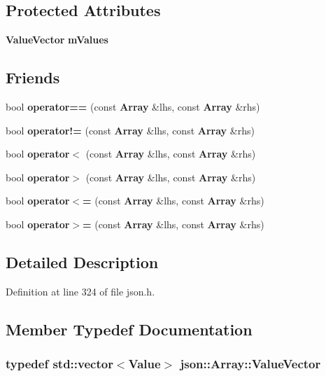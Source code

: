 \subsection*{Protected Attributes}
\begin{DoxyCompactItemize}
\item 
{\bf Value\+Vector} {\bf m\+Values}
\end{DoxyCompactItemize}
\subsection*{Friends}
\begin{DoxyCompactItemize}
\item 
bool {\bf operator==} (const {\bf Array} \&lhs, const {\bf Array} \&rhs)
\item 
bool {\bf operator!=} (const {\bf Array} \&lhs, const {\bf Array} \&rhs)
\item 
bool {\bf operator$<$} (const {\bf Array} \&lhs, const {\bf Array} \&rhs)
\item 
bool {\bf operator$>$} (const {\bf Array} \&lhs, const {\bf Array} \&rhs)
\item 
bool {\bf operator$<$=} (const {\bf Array} \&lhs, const {\bf Array} \&rhs)
\item 
bool {\bf operator$>$=} (const {\bf Array} \&lhs, const {\bf Array} \&rhs)
\end{DoxyCompactItemize}


\subsection{Detailed Description}


Definition at line 324 of file json.\+h.



\subsection{Member Typedef Documentation}
\subsubsection[{Value\+Vector}]{\setlength{\rightskip}{0pt plus 5cm}typedef std\+::vector$<${\bf Value}$>$ {\bf json\+::\+Array\+::\+Value\+Vector}}\label{classjson_1_1_array_a9980cfbe25d0da308156cf489d86b1a9}


